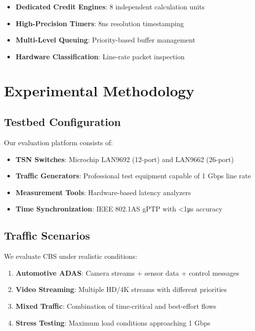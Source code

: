 \documentclass[10pt, journal, compsoc]{IEEEtran}
\begin{document}
\begin{itemize}
    \item \textbf{Dedicated Credit Engines}: 8 independent calculation units
    \item \textbf{High-Precision Timers}: 8ns resolution timestamping
    \item \textbf{Multi-Level Queuing}: Priority-based buffer management
    \item \textbf{Hardware Classification}: Line-rate packet inspection
\end{itemize}

\section{Experimental Methodology}

\subsection{Testbed Configuration}

Our evaluation platform consists of:

\begin{itemize}
    \item \textbf{TSN Switches}: Microchip LAN9692 (12-port) and LAN9662 (26-port)
    \item \textbf{Traffic Generators}: Professional test equipment capable of 1 Gbps line rate
    \item \textbf{Measurement Tools}: Hardware-based latency analyzers
    \item \textbf{Time Synchronization}: IEEE 802.1AS gPTP with <1μs accuracy
\end{itemize}

\subsection{Traffic Scenarios}

We evaluate CBS under realistic conditions:

\begin{enumerate}
    \item \textbf{Automotive ADAS}: Camera streams + sensor data + control messages
    \item \textbf{Video Streaming}: Multiple HD/4K streams with different priorities
    \item \textbf{Mixed Traffic}: Combination of time-critical and best-effort flows
    \item \textbf{Stress Testing}: Maximum load conditions approaching 1 Gbps
\end{enumerate}
\end{document}
